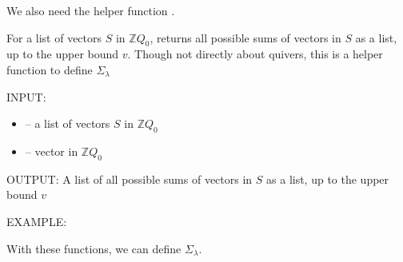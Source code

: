\documentclass[letterpaper,10pt,english]{sphinxmanual}
\begin{document}
\sphinxAtStartPar
We also need the helper function .

\begin{fulllineitems}
\label{\detokenize{index:quivercombinatorics.N_set}}
\pysigstartsignatures
\pysiglinewithargsret
{}
{\sphinxparamcomma {}}
{}
\pysigstopsignatures
\sphinxAtStartPar
For a list of vectors \(S\) in \(\mathbb{Z}Q_0\), returns all possible sums of vectors in \(S\) as a list, up to the upper bound \(v\). Though not directly about quivers, this is a helper function to define \(\Sigma_\lambda\)

\sphinxAtStartPar
INPUT:
\begin{itemize}
\item {} 
\sphinxAtStartPar
{} – a list of vectors \(S\) in \(\mathbb{Z}Q_0\)

\item {} 
\sphinxAtStartPar
{} – vector in \(\mathbb{Z}Q_0\)

\end{itemize}

\sphinxAtStartPar
OUTPUT: A list of all possible sums of vectors in \(S\) as a list, up to the upper bound \(v\)

\sphinxAtStartPar
EXAMPLE:

\begin{sphinxVerbatim}[commandchars=\\\{\}]
  
 \PYG{p}{[}\PYG{p}{[} \PYG{p}{]}\PYG{p}{]} \PYG{p}{[} \PYG{p}{]}
\PYG{p}{[}     \PYG{p}{]}
\end{sphinxVerbatim}

\end{fulllineitems}


\sphinxAtStartPar
With these functions, we can define \(\Sigma_{\lambda}\).
\end{document}
